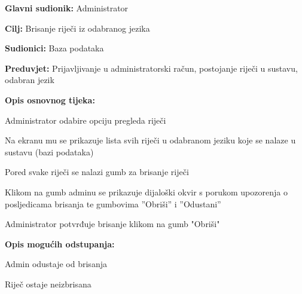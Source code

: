 \noindent {}
\begin{packed_item}

	\item \textbf{Glavni sudionik: } Administrator
	\item \textbf{Cilj: } Brisanje riječi iz odabranog jezika
	\item \textbf{Sudionici: } Baza podataka
	\item \textbf{Preduvjet: } Prijavljivanje u administratorski račun, postojanje riječi u sustavu, odabran jezik
	\item  \textbf{Opis osnovnog tijeka:}
	
	\item[] \begin{packed_enum}
		
		\item Administrator odabire opciju pregleda riječi
		\item Na ekranu mu se prikazuje lista svih riječi u odabranom jeziku koje se nalaze u sustavu (bazi podataka)
		\item Pored svake riječi se nalazi gumb za brisanje riječi
		\item Klikom na gumb adminu se prikazuje dijaloški okvir s porukom upozorenja o posljedicama brisanja te gumbovima ”Obriši” i ”Odustani”
		\item Administrator potvrđuje brisanje klikom na gumb "Obriši"

	\end{packed_enum}

	\item  \textbf{Opis mogućih odstupanja:}
	
	\item[] \begin{packed_item}

		\item[5.a] Admin odustaje od brisanja
		\item[] \begin{packed_enum}
			
			\item Riječ ostaje neizbrisana
			
		\end{packed_enum}
		
	\end{packed_item}
	
\end{packed_item}



